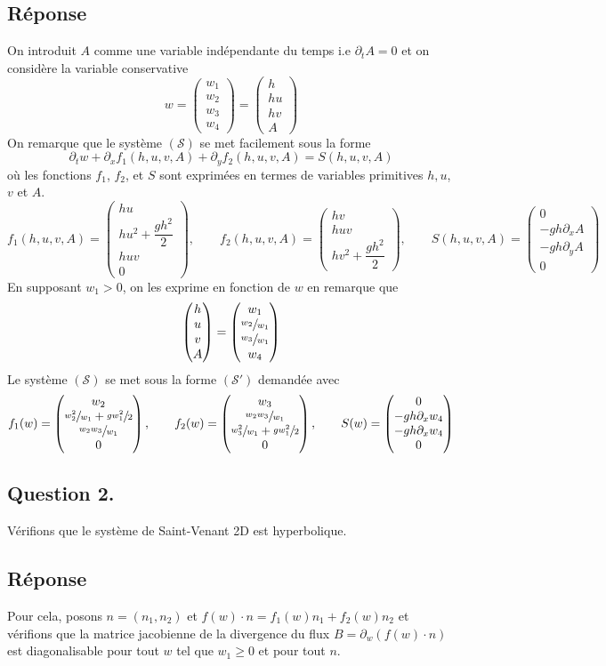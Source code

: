 \documentclass[
	french,
	11pt, %
]{fphw}
\newcommand{\myvec}[3]{\begin{pmatrix} #1  \\ #2 \\ #3 \end{pmatrix}}   %
\renewcommand{\vector}[4]{\begin{pmatrix} #1  \\ #2 \\ #3 \\ #4 \end{pmatrix}}   %
\begin{document}
\subsection*{Réponse} 

On introduit $A$ comme une variable indépendante du temps i.e $\partial_t A = 0$ et on considère la variable conservative 
$$w= \vector{w_1}{w_2}{w_3}{w_4} = \vector{h}{hu}{hv}{A}$$
On remarque que le système $(\mathcal{S})$ se met facilement sous la forme
$$
\partial_t w + \partial_x f_1(h,u,v,A) + \partial_y f_2(h,u,v,A) = S(h,u,v,A)
$$
où les fonctions $f_1$, $f_2$, et $S$ sont exprimées en termes de variables primitives $h, u$, $v$ et $A$. 
$$f_1(h,u,v,A) = \vector{hu}{hu^2 + \dfrac{gh^2}{2}}{huv}{0}, \qquad f_2(h,u,v,A) = \myvec{hv}{huv}{hv^2 + \dfrac{gh^2}{2}{}}, \qquad S(h,u,v,A) = \vector{0}{-gh\partial_xA}{-gh\partial_y A}{0}$$
En supposant $w_1>0$, on les exprime en fonction de $w$ en remarque que $$\vector{h}{u}{v}{A} = \vector{w_1}{\sfrac{w_2}{w_1}}{\sfrac{w_3}{w_1}}{w_4}$$
Le système $(\mathcal{S})$ se met sous la forme $(\mathcal{S}')$ demandée avec 
$$f_1(w) = \vector{w_2}{\sfrac{w_2^2}{w_1} + \sfrac{gw_1^2}{2}}{\sfrac{w_2w_3}{w_1}}{0}, \qquad f_2(w) = \vector{w_3}{\sfrac{w_2w_3}{w_1}}{\sfrac{w_3^2}{w_1} + \sfrac{gw_1^2}{2}}{0}, \qquad S(w)=\vector{0}{-gh\partial_x w_4}{-gh\partial_x w_4}{0}$$



\subsection*{Question 2.}

\begin{problem}
Vérifions que le système de Saint-Venant 2D est hyperbolique.
\end{problem}


\subsection*{Réponse} 
Pour cela, posons $n=(n_1,n_2)$ et $f(w)\cdot n = f_1(w)n_1 + f_2(w)n_2$ et vérifions que la matrice jacobienne de la divergence du flux $B = \partial_w \left( f(w)\cdot n \right)$ est diagonalisable pour tout $w$ tel que $w_1 \geq 0$ et pour tout $n$. 
\end{document}
